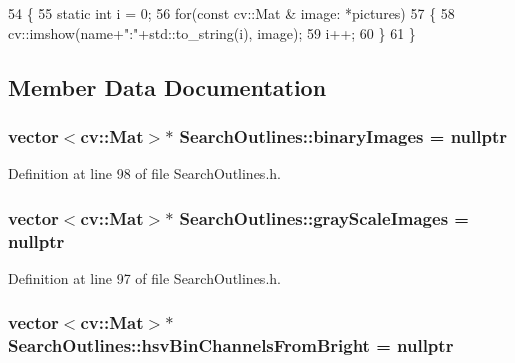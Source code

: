 \begin{DoxyCode}
54 \{
55     \textcolor{keyword}{static} \textcolor{keywordtype}{int} i = 0;
56     \textcolor{keywordflow}{for}(\textcolor{keyword}{const} cv::Mat & image: *pictures)
57     \{
58         cv::imshow(name+\textcolor{stringliteral}{":"}+std::to\_string(i), image);
59         i++;
60     \}
61 \}
\end{DoxyCode}


\subsection{Member Data Documentation}
\hypertarget{class_search_outlines_ad32573709b7db29f00e5444110b37d23}{
\subsubsection[{binary\+Images}]{\setlength{\rightskip}{0pt plus 5cm}vector$<$cv\+::\+Mat$>$$\ast$ Search\+Outlines\+::binary\+Images = nullptr\hspace{0.3cm}{\ttfamily [private]}}}\label{class_search_outlines_ad32573709b7db29f00e5444110b37d23}


Definition at line 98 of file Search\+Outlines.\+h.

\hypertarget{class_search_outlines_a2284f3f55022613e11f2d023a6b76e07}{
\subsubsection[{gray\+Scale\+Images}]{\setlength{\rightskip}{0pt plus 5cm}vector$<$cv\+::\+Mat$>$$\ast$ Search\+Outlines\+::gray\+Scale\+Images = nullptr\hspace{0.3cm}{\ttfamily [private]}}}\label{class_search_outlines_a2284f3f55022613e11f2d023a6b76e07}


Definition at line 97 of file Search\+Outlines.\+h.

\hypertarget{class_search_outlines_a1eb23566d056c92a441067d8c9cd03ae}{
\subsubsection[{hsv\+Bin\+Channels\+From\+Bright}]{\setlength{\rightskip}{0pt plus 5cm}vector$<$cv\+::\+Mat$>$$\ast$ Search\+Outlines\+::hsv\+Bin\+Channels\+From\+Bright = nullptr\hspace{0.3cm}{\ttfamily [private]}}}\label{class_search_outlines_a1eb23566d056c92a441067d8c9cd03ae}


